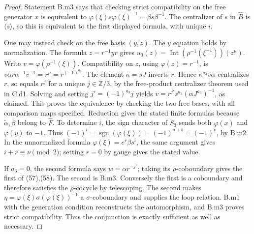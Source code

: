 \begin{proof}
Statement B.m3 says that checking strict compatibility on the free generator $x$ is equivalent to
$\varphi(\xi)s\varphi(\xi)^{-1}=\beta s\beta^{-1}$. The centralizer of $s$ in $\widehat B$ is $\langle s\rangle$, so this is equivalent to the first displayed formula, with unique $i$.

One may instead check on the free basis $(y,z)$. The $y$ equation holds by normalization. The formula $z=r^{-1}yr$ gives
$u_0(z)=\operatorname{Int}(\rho^{-1}(\xi^{-1}))(z^\mu)$. Write $v=\varphi(\rho^{-1}(\xi))$. Compatibility on $z$, using $\varphi(z)=r^{-1}$, is
$v\alpha r\alpha^{-1}v^{-1}=r^\mu=r^{(-1)^{a_3}}$.
The element $\kappa=sJ$ inverts $r$. Hence $\kappa^{a_3}v\alpha$ centralizes $r$, so equals $r^j$ for a unique $j\in\mathbb Z/3$, by the free-product centralizer theorem used in C.d1. Solving and setting $j'=(-1)^{a_3}j$ yields
$v=r^{j'}s^{a_3}(\alpha J^{a_3})^{-1}$, as claimed. This proves the equivalence by checking the two free bases, with all comparison maps specified. Reduction gives the stated finite formulas because $\widetilde\alpha,\beta$ belong to $\widehat F$. To determine $i$, the sign character of $S_3$ sends both $\varphi(x)$ and $\varphi(y)$ to $-1$. Thus $(-1)^i=\operatorname{sgn}(\varphi(\xi))=(-1)^{a+b}=(-1)^\nu$, by B.m2. In the unnormalized formula $\varphi(\xi)=e^r\beta s^i$, the same argument gives $i+r\equiv\nu\pmod2$; setting $r=0$ by gauge gives the stated value.

If $a_3=0$, the second formula says $w=\alpha r^{-j'}$; taking its $\rho$-coboundary gives the first of (57),(58). The second is B.m3. Conversely the first is a coboundary and therefore satisfies the $\rho$-cocycle by telescoping. The second makes $\eta=\varphi(\xi)\sigma(\varphi(\xi))^{-1}$ a $\sigma$-coboundary and supplies the loop relation. B.m1 with the generation condition reconstructs the automorphism, and B.m3 proves strict compatibility. Thus the conjunction is exactly sufficient as well as necessary.
\end{proof}

